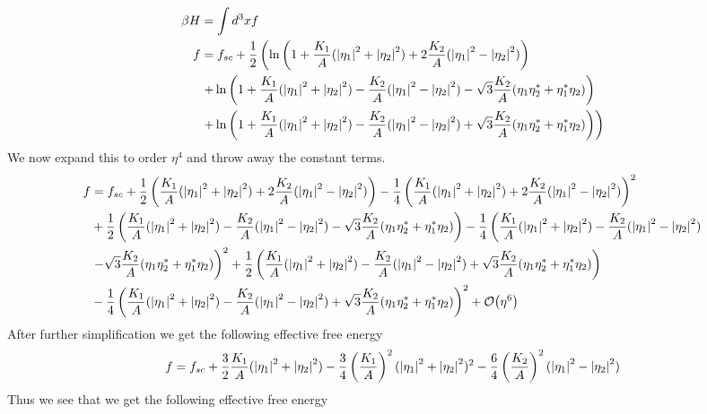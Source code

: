 \documentclass[prl,notitlepage,aps]{revtex4-1}
\begin{document}
\begin{align}
	\beta H&= \int d^3x f \nonumber\\
	f &= f_{sc} + \frac{1}{2} \left(\ln\left(1+\frac{K_1}{A}(\abs{\eta_1}^2+\abs{\eta_2}^2)+2\frac{K_2}{A}			(\abs{\eta_1}^2-\abs{\eta_2}^2)\right)\nonumber\right.\\
	  &\left.+\ln\left(1+\frac{K_1}{A}(\abs{\eta_1}^2+\abs{\eta_2}^2) -\frac{K_2}{A}(\abs{\eta_1}^2 	-\abs{\eta_2}^2)-\sqrt{3}\frac{K_2}{A}(\eta_1\eta_2^*+\eta_1^*\eta_2)\right)\nonumber\right.\\
	  &\left.+\ln\left(1+\frac{K_1}{A}(\abs{\eta_1}^2+\abs{\eta_2}^2) -\frac{K_2}{A}				(\abs{\eta_1}^2 -\abs{\eta_2}^2)+\sqrt{3}\frac{K_2}{A}(\eta_1\eta_2^*+\eta_1^*\eta_2)		    \right)\right)
\end{align}
We now expand this to order $\eta^4$  and throw away the constant terms. 
\begin{align}
	f&=f_{sc} + \frac{1}{2}\left(\frac{K_1}{A}(\abs{\eta_1}^2+\abs{\eta_2}^2)+2\frac{K_2}{A}			(\abs{\eta_1}^2-\abs{\eta_2}^2)\right)-\frac{1}{4}\left(\frac{K_1}{A}(\abs{\eta_1}			^2+\abs{\eta_2}^2)+2\frac{K_2}{A}(\abs{\eta_1}^2-\abs{\eta_2}^2)\right)^2\nonumber\\
	&+\frac{1}{2}\left(\frac{K_1}{A}(\abs{\eta_1}^2+\abs{\eta_2}^2) -\frac{K_2}{A}						(\abs{\eta_1}^2 -\abs{\eta_2}^2)-\sqrt{3}\frac{K_2}{A}(\eta_1\eta_2^*+\eta_1^*\eta_2)			\right)- \frac{1}{4}\left(\frac{K_1}{A}(\abs{\eta_1}^2+\abs{\eta_2}^2) -\frac{K_2}{A}						(\abs{\eta_1}^2 -\abs{\eta_2}^2)\nonumber\right.\\
	&\left.-\sqrt{3}\frac{K_2}{A}(\eta_1\eta_2^*+\eta_1^*\eta_2)\right)^2+\frac{1}{2}				\left(\frac{K_1}{A}(\abs{\eta_1}^2+\abs{\eta_2}^2) -\frac{K_2}{A}								(\abs{\eta_1}^2 -\abs{\eta_2}^2)+\sqrt{3}\frac{K_2}{A}(\eta_1\eta_2^*+\eta_1^*\eta_2)			\right)\nonumber\\
	&-\frac{1}{4}\left(\frac{K_1}{A}(\abs{\eta_1}^2+\abs{\eta_2}^2)
	-\frac{K_2}{A}(\abs{\eta_1}^2 -\abs{\eta_2}^2) +\sqrt{3}\frac{K_2}{A}							(\eta_1\eta_2^*+\eta_1^*\eta_2)\right)^2 + \order{\eta^6}
\end{align}
After further simplification we get the following effective free energy
\begin{align}
	f=f_{sc} + \frac{3}{2}\frac{K_1}{A}(\abs{\eta_1}^2+\abs{\eta_2}^2)-\frac{3}{4}					\left(\frac{K_1}{A}\right)^2(\abs{\eta_1}^2+\abs{\eta_2}^2)^2-\frac{6}{4}\left(\frac{K_2}		{A}\right)^2(\abs{\eta_1}^2-\abs{\eta_2}^2)
\end{align}
Thus we see that we get the following effective free energy
\end{document}
